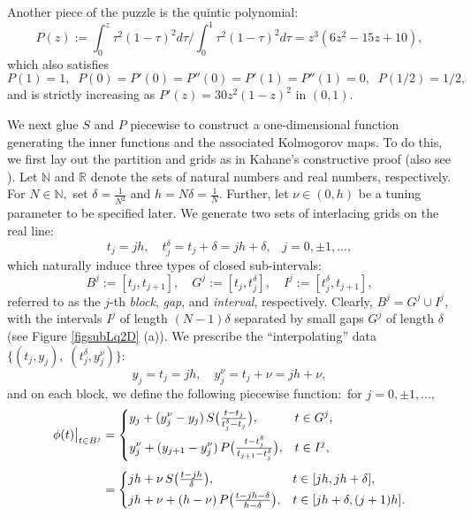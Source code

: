 \documentclass[10pt,reqno,final]{amsart}
\theoremstyle{remark}
\theoremstyle{definition}
\newcommand{\wll}[1]{#1}
\begin{document}
Another piece of the puzzle is the \wll{quintic} polynomial:  
\begin{equation}\label{P-fun} 
P(z):=\int_0^{z}\tau^2(1-\tau)^2 d\tau\Big/\int_0^{1}\tau^2(1-\tau)^2 d\tau= z^3(6z^2-15z+10), 
\end{equation}
which also satisfies 
\begin{equation}\label{Pproperty}
     P(1)=1,\;\; P(0)=P'(0)=P''(0)=P'(1)=P''(1)=0, \;\; P(1/2)=1/2,
\end{equation}
 and is strictly  increasing as $P'(z)=30z^2(1-z)^2$ in $(0,1).$ 

 
We next glue $S$ and $P$ piecewise to construct a one-dimensional function generating the inner functions and the associated Kolmogorov maps.
  To do this, we first lay out the partition and grids as in \wll{Kahane's constructive proof 
  \cite{Kahane1975} (also see \cite{Lorentz1996,Igelnik2003}).} 
  \wll{Let $\mathbb{N}$ and $\mathbb{R}$ denote the sets of natural numbers and real numbers, respectively.
For  $N\in \mathbb N,$ set 
$\delta=\tfrac 1 {N^2}$ and 
$h=N\delta=\tfrac 1 N.$ Further, let $\nu\in (0,h)$ be 
a tuning parameter to be specified later.} 
We generate two sets of interlacing grids on the real line:
\begin{equation}\label{tjhd}
t_j=jh, \quad t_j^\delta=t_j+\delta=jh+\delta,\;\;\; j=0,\pm 1,\ldots,
\end{equation}
which naturally induce  three types of closed sub-intervals:
\begin{equation}\label{1D-P0A} 
  B^j:=[t_j,t_{j+1}], \quad  G^j:=[t_j, t_j^\delta],\quad   I^j:=[t_j^\delta, t_{j+1}],
\end{equation}
referred to as the $j$-th {\em block}, {\em gap}, and {\em interval}, respectively. Clearly, $B^j=G^j\cup I^j,$ with the intervals $I^j$ of length $(N-1)\delta$  separated by small gaps $G^j$  of length $\delta$ (see Figure \ref{figsubLq2D} (a)). 
We prescribe the ``interpolating'' data  $\{(t_j, y_j),\; (t_j^\delta, y_j^\nu)\}$:  
\begin{equation}\label{yjdata}
    y_j=t_j=jh,\quad  y_j^\nu=t_j+\nu=jh+\nu,
\end{equation}
and on each block, we define the following piecewise function:~for  $j=0,\pm 1,\ldots,$ 
\begin{equation}\label{shapfunc0}
\begin{split}
\phi(t)\big|_{t\in B^j}&=
\begin{dcases}
y_j+(y_j^\nu-y_j)\, S\big(\tfrac{t-t_j}{t_j^\delta-t_j}\big), &t\in G^j,\\
y_j^\nu+(y_{j+1}-y_j^\nu)\,P\big(\tfrac{t-t_j^\delta}{t_{j+1}-t_j^\delta}\big), &t\in I^j,
\end{dcases}\\[4pt]
&=
\begin{dcases}
jh+\nu\, S\big(\tfrac{t-jh}\delta\big), &t\in [jh, jh+\delta],\\
jh+\nu+(h-\nu)\,P\big(\tfrac{t-jh-\delta}{h-\delta}\big), &t\in [jh+\delta, (j+1)h].
\end{dcases}
\end{split}
\end{equation}
\end{document}
